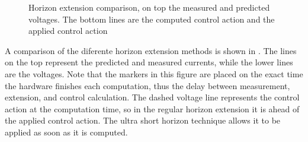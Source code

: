 \begin{figure}[!htb]
	\centering
	\begin{subfigmatrix}{2}
	\end{subfigmatrix}
	\caption{Horizon extension comparison, on top the measured and predicted voltages. The bottom lines are the computed control action and the applied control action}
	\label{fig:hor_comparison}
\end{figure}

A comparison of the diferente horizon extension methods is shown in . The lines on the top represent the predicted and measured currents, while the lower lines are the voltages. Note that the markers in this figure are placed on the exact time the hardware finishes each computation, thus the delay between measurement, extension, and control calculation. The dashed voltage line represents the control action at the computation time, so in the regular horizon extension it is ahead of the applied control action. The ultra short horizon technique allows it to be applied as soon as it is computed.
